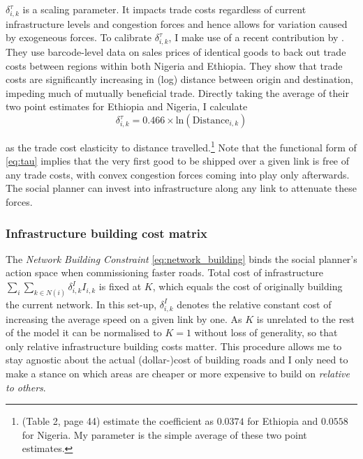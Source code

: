 \documentclass[11pt, oneside]{article}   	%
\begin{document}
$\delta^{\tau}_{i, k}$ is a scaling parameter. It impacts trade costs regardless of current infrastructure levels and congestion forces and hence allows for variation caused by exogeneous forces. To calibrate $\delta^{\tau}_{i, k}$, I make use of a recent contribution by \cite{atkin_whos_2015}. They use barcode-level data on sales prices of identical goods to back out trade costs between regions within both Nigeria and Ethiopia. They show that trade costs are significantly increasing in (log) distance between origin and destination, impeding much of mutually beneficial trade. Directly taking the average of their two point estimates for Ethiopia and Nigeria, I calculate
\begin{equation}
  \delta^{\tau}_{i,k} =  0.466\times\textrm{ln}(\textrm{Distance}_{i,k})
  \label{eq:delta_tau}
\end{equation}

as the trade cost elasticity to distance travelled.\footnote{\citeauthor{atkin_whos_2015} (Table 2, page 44) estimate the coefficient as $0.0374$ for Ethiopia and $0.0558$ for Nigeria. My parameter is the simple average of these two point estimates.} Note that the functional form of \eqref{eq:tau} implies that the very first good to be shipped over a given link is free of any trade costs, with convex congestion forces coming into play only  afterwards. The social planner can invest into infrastructure along any link to attenuate these forces.

\subsubsection{Infrastructure building cost matrix }
The \emph{Network Building Constraint} \eqref{eq:network_building} binds the social planner's action space when commissioning faster roads. Total cost of infrastructure $\sum_{i}^{}\sum_{k \in N(i)}^{} \delta_{i,k}^{I}I_{i,k}$ is fixed at $K$, which equals the cost of originally building the current network. In this set-up, $\delta_{i,k}^{I}$ denotes the relative constant cost of increasing the average speed on a given link by one. As $K$ is unrelated to the rest of the model it can be normalised to $K=1$ without loss of generality, so that only relative infrastructure building costs matter. This procedure allows me to stay agnostic about the actual (dollar-)cost of building roads and I only need to make a stance on which areas are cheaper or more expensive to build on \emph{relative to others}.
\end{document}
